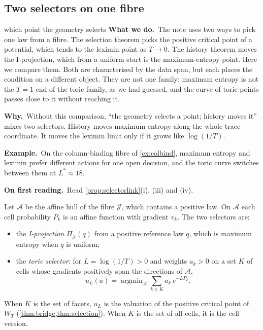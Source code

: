 \documentclass[11pt]{article}
\theoremstyle{definition}\newtheorem{definition}[theorem]{Definition}\newtheorem{remark}[theorem]{Remark}\newtheorem{example}[theorem]{Example}\newtheorem{problem}[theorem]{Open problem}\crefname{problem}{Problem}{Problems}
\newcommand{\rbwhat}{\textcolor{rbWhat}{\textbf{What we do.}}~}\newcommand{\rbwhy}{\par\smallskip\textcolor{rbWhy}{\textbf{Why.}}~}
\newcommand{\rbex}{\par\smallskip\textcolor{rbEx}{\textbf{Example.}}~}\newcommand{\rbbg}{\par\smallskip\textcolor{rbBg}{\textbf{Background.}}~}
\newcommand{\rbfirst}{\par\smallskip\textcolor{rbFirst}{\textbf{On first reading.}}~}
\begin{document}
\subsection{Two selectors on one fibre}\label{sec:selectorlink}
\begin{readerbox}{which point the geometry selects}
\rbwhat The note uses two ways to pick one law from a fibre. The selection theorem picks the positive critical point of a potential, which tends to the leximin point as $T\to0$. The history theorem moves the I-projection, which from a uniform start is the maximum-entropy point. Here we compare them. Both are characterised by the data span, but each places the condition on a different object. They are not one family: maximum entropy is not the $T=1$ end of the toric family, as we had guessed, and the curve of toric points passes close to it without reaching it.
\rbwhy Without this comparison, ``the geometry selects a point; history moves it'' mixes two selectors. History moves maximum entropy along the whole trace coordinate. It moves the leximin limit only if it grows like $\log(1/T)$.
\rbex On the column-binding fibre of \cref{ex:colbind}, maximum entropy and leximin prefer different actions for one open decision, and the toric curve switches between them at $L^*\approx18$.
\rbfirst Read \cref{prop:selectorlink}(i), (iii) and (iv).
\end{readerbox}

Let $\mathcal A$ be the affine hull of the fibre $\mathcal J$, which contains a positive law. On $\mathcal A$ each cell probability $P_k$ is an affine function with gradient $v_k$. The two selectors are:
\begin{itemize}
\item the \emph{I-projection} $\Pi_{\mathcal J}(q)$ from a positive reference law $q$, which is maximum entropy when $q$ is uniform;
\item the \emph{toric selector}: for $L=\log(1/T)>0$ and weights $a_k>0$ on a set $K$ of cells whose gradients positively span the directions of $\mathcal A$,
\[
u_L(a)=\operatorname{argmin}_{\mathcal A}\sum_{k\in K}a_k\,e^{-LP_k}.
\]
\end{itemize}
When $K$ is the set of facets, $u_L$ is the valuation of the positive critical point of $W_T$ (\cref{thm:bridge,thm:selection}). When $K$ is the set of all cells, it is the cell version.
\end{document}
